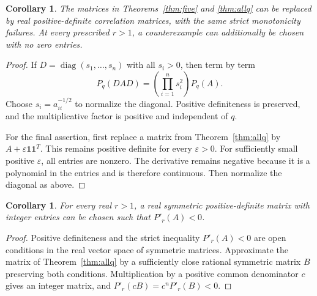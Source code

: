 \documentclass[11pt]{article}
\newtheorem{corollary}[theorem]{Corollary}
\begin{document}
\begin{corollary}\label{cor:correlations}
The matrices in Theorems~\ref{thm:five} and \ref{thm:allq} can be replaced by real positive-definite correlation matrices, with the same strict monotonicity failures. At every prescribed $r>1$, a counterexample can additionally be chosen with no zero entries.
\end{corollary}
\begin{proof}
If $D=\operatorname{diag}(s_1,\ldots,s_n)$ with all $s_i>0$, then term by term
\[
 P_q(DAD)=\left(\prod_{i=1}^n s_i^2\right)P_q(A).
\]
Choose $s_i=a_{ii}^{-1/2}$ to normalize the diagonal. Positive definiteness is preserved, and the multiplicative factor is positive and independent of $q$.

For the final assertion, first replace a matrix from Theorem~\ref{thm:allq} by $A+\varepsilon\mathbf1\mathbf1^T$. This remains positive definite for every $\varepsilon>0$. For sufficiently small positive $\varepsilon$, all entries are nonzero. The derivative remains negative because it is a polynomial in the entries and is therefore continuous. Then normalize the diagonal as above.
\end{proof}

\begin{corollary}\label{cor:integer}
For every real $r>1$, a real symmetric positive-definite matrix with integer entries can be chosen such that $P'_r(A)<0$.
\end{corollary}
\begin{proof}
Positive definiteness and the strict inequality $P'_r(A)<0$ are open conditions in the real vector space of symmetric matrices. Approximate the matrix of Theorem~\ref{thm:allq} by a sufficiently close rational symmetric matrix $B$ preserving both conditions. Multiplication by a positive common denominator $c$ gives an integer matrix, and $P'_r(cB)=c^nP'_r(B)<0$.
\end{proof}
\end{document}
